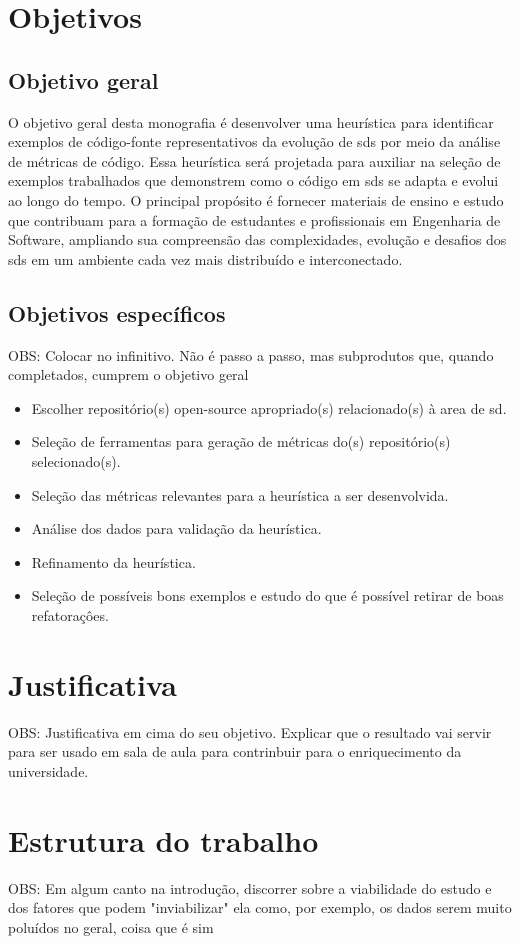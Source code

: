 \section{Objetivos}\label{sec:objetivos}

\subsection{Objetivo geral}\label{subsec:objetivoGeral}
O objetivo geral desta monografia é desenvolver uma heurística para identificar exemplos de código-fonte representativos da evolução de \gls{sds} por meio da análise de métricas de código. Essa heurística será projetada para auxiliar na seleção de exemplos trabalhados que demonstrem como o código em \gls{sds} se adapta e evolui ao longo do tempo. O principal propósito é fornecer materiais de ensino e estudo que contribuam para a formação de estudantes e profissionais em Engenharia de Software, ampliando sua compreensão das complexidades, evolução e desafios dos \gls{sds} em um ambiente cada vez mais distribuído e interconectado.

\subsection{Objetivos específicos}\label{subsec:objetivosEspecificos}
OBS: Colocar no infinitivo. Não é passo a passo, mas subprodutos que, quando completados, cumprem o objetivo geral
\begin{itemize}
    \item Escolher repositório(s) open-source apropriado(s) relacionado(s) à area de \gls{sd}.
    \item Seleção de ferramentas para geração de métricas do(s) repositório(s) selecionado(s).
    \item Seleção das métricas relevantes para a heurística a ser desenvolvida.
    \item Análise dos dados para validação da heurística.
    \item Refinamento da heurística.
    \item Seleção de possíveis bons exemplos e estudo do que é possível retirar de boas refatoraçôes.
\end{itemize}

\section{Justificativa}\label{sec:justificativa}
OBS: Justificativa em cima do seu objetivo.
Explicar que o resultado vai servir para ser usado em sala de aula para contrinbuir para o enriquecimento da universidade.

\section{Estrutura do trabalho}\label{sec:estruturaTrabalho}

OBS: Em algum canto na introdução, discorrer sobre a viabilidade do estudo e dos fatores que podem "inviabilizar" ela como, por exemplo, os dados serem muito poluídos no geral, coisa que é sim